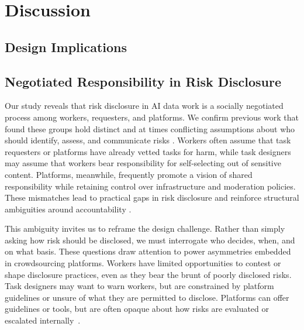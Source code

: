 \section{Discussion}


\subsection{Design Implications}

\subsection{Negotiated Responsibility in Risk Disclosure}
Our study reveals that risk disclosure in AI data work is a socially negotiated process among workers, requesters, and platforms. We confirm previous work that found these groups hold distinct and at times conflicting assumptions about who should identify, assess, and communicate risks \cite{fieseler_unfairness_2019}. Workers often assume that task requesters or platforms have already vetted tasks for harm, while task designers may assume that workers bear responsibility for self-selecting out of sensitive content. Platforms, meanwhile, frequently promote a vision of shared responsibility while retaining control over infrastructure and moderation policies. These mismatches lead to practical gaps in risk disclosure and reinforce structural ambiguities around accountability \cite{Suchman2002LocatedAccountabilities, widder_dislocated_2023}.


This ambiguity invites us to reframe the design challenge. Rather than simply asking how risk should be disclosed, we must interrogate who decides, when, and on what basis. These questions draw attention to power asymmetries embedded in crowdsourcing platforms. Workers have limited opportunities to contest or shape disclosure practices, even as they bear the brunt of poorly disclosed risks. Task designers may want to warn workers, but are constrained by platform guidelines or unsure of what they are permitted to disclose. Platforms can offer guidelines or tools, but are often opaque about how risks are evaluated or escalated internally~\cite{roberts2019behind}.

